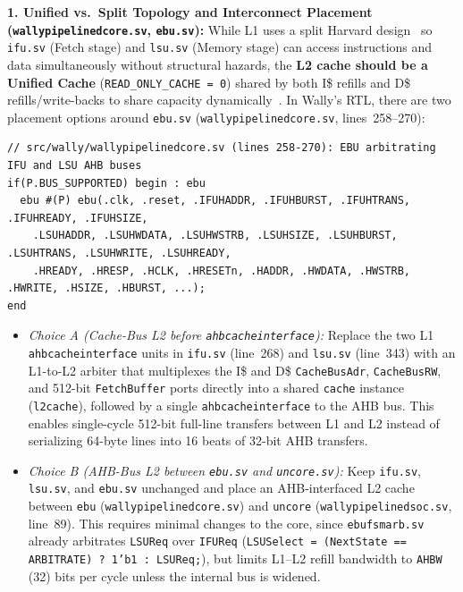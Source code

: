\documentclass[11pt,a4paper]{article}
\begin{document}
\textbf{1. Unified vs.\ Split Topology and Interconnect Placement (\texttt{wallypipelinedcore.sv}, \texttt{ebu.sv}):}
While L1 uses a split Harvard design~\cite{wiki_harvard} so \texttt{ifu.sv} (Fetch stage) and \texttt{lsu.sv} (Memory stage) can access instructions and data simultaneously without structural hazards, the \textbf{L2 cache should be a Unified Cache} (\texttt{READ\_ONLY\_CACHE = 0}) shared by both I\$ refills and D\$ refills/write-backs to share capacity dynamically~\cite{patterson2020}. In Wally's RTL, there are two placement options around \texttt{ebu.sv} (\texttt{wallypipelinedcore.sv}, lines~258--270):
\begin{lstlisting}[style=verilogstyle]
// src/wally/wallypipelinedcore.sv (lines 258-270): EBU arbitrating IFU and LSU AHB buses
if(P.BUS_SUPPORTED) begin : ebu
  ebu #(P) ebu(.clk, .reset, .IFUHADDR, .IFUHBURST, .IFUHTRANS, .IFUHREADY, .IFUHSIZE,
    .LSUHADDR, .LSUHWDATA, .LSUHWSTRB, .LSUHSIZE, .LSUHBURST, .LSUHTRANS, .LSUHWRITE, .LSUHREADY,
    .HREADY, .HRESP, .HCLK, .HRESETn, .HADDR, .HWDATA, .HWSTRB, .HWRITE, .HSIZE, .HBURST, ...);
end
\end{lstlisting}
\begin{itemize}[leftmargin=1.4em, itemsep=2.5pt, topsep=1.5pt]
    \item \emph{Choice A (Cache-Bus L2 before \texttt{ahbcacheinterface}):} Replace the two L1 \texttt{ahbcacheinterface} units in \texttt{ifu.sv} (line~268) and \texttt{lsu.sv} (line~343) with an L1-to-L2 arbiter that multiplexes the I\$ and D\$ \texttt{CacheBusAdr}, \texttt{CacheBusRW}, and 512-bit \texttt{FetchBuffer} ports directly into a shared \texttt{cache} instance (\texttt{l2cache}), followed by a single \texttt{ahbcacheinterface} to the AHB bus. This enables single-cycle 512-bit full-line transfers between L1 and L2 instead of serializing 64-byte lines into 16 beats of 32-bit AHB transfers.
    \item \emph{Choice B (AHB-Bus L2 between \texttt{ebu.sv} and \texttt{uncore.sv}):} Keep \texttt{ifu.sv}, \texttt{lsu.sv}, and \texttt{ebu.sv} unchanged and place an AHB-interfaced L2 cache between \texttt{ebu} (\texttt{wallypipelinedcore.sv}) and \texttt{uncore} (\texttt{wallypipelinedsoc.sv}, line~89). This requires minimal changes to the core, since \texttt{ebufsmarb.sv} already arbitrates \texttt{LSUReq} over \texttt{IFUReq} (\texttt{LSUSelect = (NextState == ARBITRATE)\allowbreak\ ?\ 1'b1 : LSUReq;}), but limits L1--L2 refill bandwidth to \texttt{AHBW} (32) bits per cycle unless the internal bus is widened.
\end{itemize}
\end{document}
